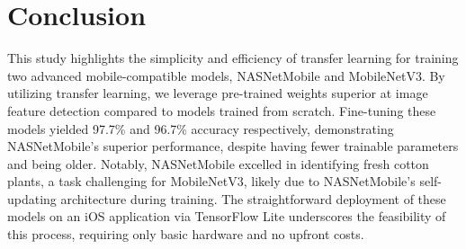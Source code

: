 \documentclass[conference]{IEEEtran}
\begin{document}
\section{Conclusion}

This study highlights the simplicity and efficiency of transfer learning for training two advanced mobile-compatible models, NASNetMobile and MobileNetV3. By utilizing transfer learning, we leverage pre-trained weights superior at image feature detection compared to models trained from scratch. Fine-tuning these models yielded 97.7\% and 96.7\% accuracy respectively, demonstrating NASNetMobile's superior performance, despite having fewer trainable parameters and being older. Notably, NASNetMobile excelled in identifying fresh cotton plants, a task challenging for MobileNetV3, likely due to NASNetMobile's self-updating architecture during training. The straightforward deployment of these models on an iOS application via TensorFlow Lite underscores the feasibility of this process, requiring only basic hardware and no upfront costs.


%
\end{document}
